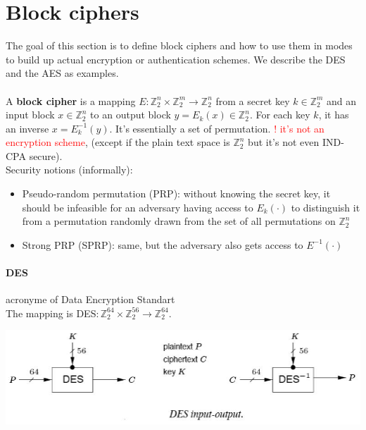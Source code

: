 \documentclass[11pt,a4paper]{report}
\begin{document}
\section{Block ciphers}
The goal of this section is to define block ciphers and how to use them in modes to build up actual encryption or authentication schemes. We describe the DES and the AES as examples.\\
\\
A \textbf{block cipher} is a mapping $E : \mathbb{Z}_2^n \times \mathbb{Z}_2^m \rightarrow \mathbb{Z}_2^n$ from a secret key $k \in \mathbb{Z}_2^m$ and an input block $x \in \mathbb{Z}_2^n$ to an output block $y = E_k(x) \in \mathbb{Z}_2^n $. For each key $k$, it has an inverse $x = E_k^{-1}(y)$. It's essentially a set of permutation. \textcolor{red}{! it's not an encryption scheme}, (except if the plain text space is $\mathbb{Z}_2^n$ but it's not even IND-CPA secure).\\
Security notions (informally):
\begin{itemize}
\item Pseudo-random permutation (PRP): without knowing the secret key, it should be infeasible for an adversary having access to $E_k(·)$ to distinguish it from a permutation randomly drawn from the set of all permutations on $\mathbb{Z}_2^n$
\item Strong PRP (SPRP): same, but the adversary also gets access to $E^{-1}(·)$
\end{itemize}

\paragraph{DES} \label{sec:DES} acronyme of Data Encryption Standart\\
The mapping is DES$ : \mathbb{Z}_2^{64} \times \mathbb{Z}_2^{56} \rightarrow \mathbb{Z}_2^{64}$.
\begin{center}
\includegraphics[scale=0.6]{img/img2.png}
\end{center}
\end{document}
